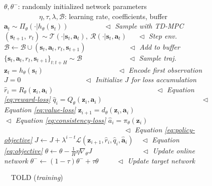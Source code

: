 \documentclass{article}
\begin{document}
\begin{figure}[t]
\vspace{-0.1in}
\begin{algorithm}[H]
\caption{~~TOLD {\color{CadetBlue}(\emph{training})}}
\label{alg:training}
\begin{algorithmic}[1]
\REQUIRE $\theta, \theta^{-}$: randomly initialized network parameters\\
~~~~~~~~~~$\eta, \tau, \lambda, \mathcal{B}$: learning rate, coefficients, buffer
\STATE $\mathbf{a}_{t} \sim \Pi_{\theta}(\cdot | h_{\theta}(\mathbf{s}_{t}))$~~~~~~~~~~{\color{CadetBlue}$\vartriangleleft$ \emph{Sample with TD-MPC}}
\STATE $(\mathbf{s}_{t+1},~r_{t}) \sim \mathcal{T}(\cdot | \mathbf{s}_{t}, \mathbf{a}_{t}),~ \mathcal{R}(\cdot | \mathbf{s}_{t}, \mathbf{a}_{t})$~~~{\color{CadetBlue}$\vartriangleleft$ \emph{Step env.}}
\STATE $\mathcal{B} \leftarrow \mathcal{B} \cup (\mathbf{s}_{t}, \mathbf{a}_{t}, r_{t}, \mathbf{s}_{t+1})$~~~~~~~~~~~~{\color{CadetBlue}$\vartriangleleft$ \emph{Add to buffer}}
\ENDFOR
{}
\STATE $\{ \mathbf{s}_{t}, \mathbf{a}_{t}, r_{t}, \mathbf{s}_{t+1} \}_{t:t+H} \sim \mathcal{B}$~~~~~~~~~~~~~{\color{CadetBlue}$\vartriangleleft$ \emph{Sample traj.}}
\STATE $\mathbf{z}_{t} = h_{\theta}(\mathbf{s}_{t})$~~~~~~~~~~~~~~~~~~~~~{\color{CadetBlue}$\vartriangleleft$ \emph{Encode first observation}}
\STATE $J = 0$~~~~~~~~~~~~~~~~~~{\color{CadetBlue}$\vartriangleleft$ \emph{Initialize $J$ for loss accumulation}}
\STATE $\hat{r}_{i} = R_{\theta}(\mathbf{z}_{i}, \mathbf{a}_{i})$~~~~~~~~~~~~~~~~~~~~~~~~~~~~~{\color{CadetBlue}$\vartriangleleft$ \emph{Equation \ref{eq:reward-loss}}}
\STATE $\hat{q}_{i} = Q_{\theta}(\mathbf{z}_{i}, \mathbf{a}_{i})$~~~~~~~~~~~~~~~~~~~~~~~~~~~~{\color{CadetBlue}$\vartriangleleft$ \emph{Equation \ref{eq:value-loss}}}
\STATE $\mathbf{z}_{i+1} = d_{\theta}(\mathbf{z}_{i}, \mathbf{a}_{i})$~~~~~~~~~~~~~~~~~~~~~~~{\color{CadetBlue}$\vartriangleleft$ \emph{Equation \ref{eq:consistency-loss}}}
\STATE $\hat{a}_{i} = \pi_{\theta}(\mathbf{z}_{i})$~~~~~~~~~~~~~~~~~~~~~~~~~~~~~~~~~~{\color{CadetBlue}$\vartriangleleft$ \emph{Equation \ref{eq:policy-objective}}}
\STATE $J \leftarrow J + \lambda^{i-t} \mathcal{L}(\mathbf{z}_{i+1}, \hat{r}_{i}, \hat{q}_{i}, \hat{\mathbf{a}}_{i})$~~{\color{CadetBlue}$\vartriangleleft$ \emph{Equation \ref{eq:objective}}}
\ENDFOR
\STATE $\theta \leftarrow \theta - \frac{1}{H} \eta \nabla_{\theta} J$~~~~~~~~~~~~~~{\color{CadetBlue}$\vartriangleleft$ \emph{Update online network}}
\STATE $\theta^{-} \leftarrow (1 - \tau) \theta^{-} + \tau \theta$~~~~~{\color{CadetBlue}$\vartriangleleft$ \emph{Update target network}}
\ENDFOR
\ENDWHILE
\end{algorithmic}
\end{algorithm}
\vspace{-0.35in}
\end{figure}
\end{document}
